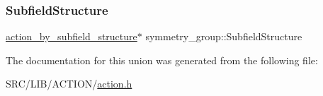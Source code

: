\subsubsection{\texorpdfstring{Subfield\+Structure}{SubfieldStructure}}
{\footnotesize\ttfamily \mbox{\hyperlink{classaction__by__subfield__structure}{action\+\_\+by\+\_\+subfield\+\_\+structure}}$\ast$ symmetry\+\_\+group\+::\+Subfield\+Structure}



The documentation for this union was generated from the following file\+:\begin{DoxyCompactItemize}
\item 
S\+R\+C/\+L\+I\+B/\+A\+C\+T\+I\+O\+N/\mbox{\hyperlink{action_8h}{action.\+h}}\end{DoxyCompactItemize}
